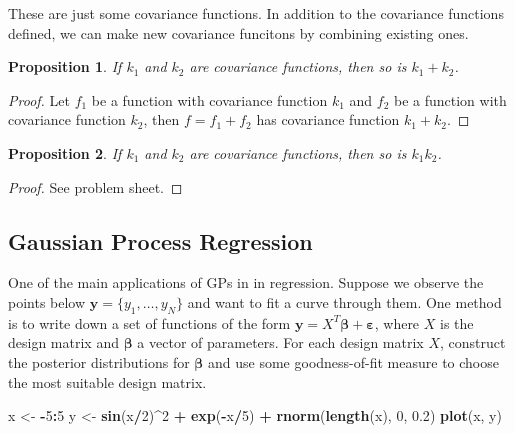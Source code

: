 \documentclass[
]{book}
\newenvironment{Shaded}{\begin{snugshade}}{\end{snugshade}}
\newcommand{\DecValTok}[1]{\textcolor[rgb]{0.00,0.00,0.81}{#1}}
\newcommand{\FloatTok}[1]{\textcolor[rgb]{0.00,0.00,0.81}{#1}}
\newcommand{\FunctionTok}[1]{\textcolor[rgb]{0.13,0.29,0.53}{\textbf{#1}}}
\newcommand{\NormalTok}[1]{#1}
\newcommand{\OtherTok}[1]{\textcolor[rgb]{0.56,0.35,0.01}{#1}}
\newcommand{\SpecialCharTok}[1]{\textcolor[rgb]{0.81,0.36,0.00}{\textbf{#1}}}
\newtheorem{proposition}{Proposition}[chapter]
\theoremstyle{definition}
\theoremstyle{definition}
\theoremstyle{definition}
\theoremstyle{definition}
\theoremstyle{remark}
\begin{document}
These are just some covariance functions. In addition to the covariance functions defined, we can make new covariance funcitons by combining existing ones.

\begin{proposition}
If \(k_1\) and \(k_2\) are covariance functions, then so is \(k_1 + k_2\).
\end{proposition}

\begin{proof}
Let \(f_1\) be a function with covariance function \(k_1\) and \(f_2\) be a function with covariance function \(k_2\), then \(f = f_1 + f_2\) has covariance function \(k_1 + k_2\).
\end{proof}

\begin{proposition}
If \(k_1\) and \(k_2\) are covariance functions, then so is \(k_1k_2\).
\end{proposition}

\begin{proof}
See problem sheet.
\end{proof}

\subsection{Gaussian Process Regression}\label{gaussian-process-regression}

One of the main applications of GPs in in regression. Suppose we observe the points below \(\boldsymbol{y} = \{y_1, \ldots, y_N\}\) and want to fit a curve through them. One method is to write down a set of functions of the form \(\boldsymbol{y} =  X^T\boldsymbol{\beta} + \boldsymbol{\varepsilon}\), where \(X\) is the design matrix and \(\boldsymbol{\beta}\) a vector of parameters. For each design matrix \(X\), construct the posterior distributions for \(\boldsymbol{\beta}\) and use some goodness-of-fit measure to choose the most suitable design matrix.

\begin{Shaded}
\begin{Highlighting}[]
\NormalTok{x }\OtherTok{\textless{}{-}} \SpecialCharTok{{-}}\DecValTok{5}\SpecialCharTok{:}\DecValTok{5}
\NormalTok{y }\OtherTok{\textless{}{-}} \FunctionTok{sin}\NormalTok{(x}\SpecialCharTok{/}\DecValTok{2}\NormalTok{)}\SpecialCharTok{\^{}}\DecValTok{2} \SpecialCharTok{+} \FunctionTok{exp}\NormalTok{(}\SpecialCharTok{{-}}\NormalTok{x}\SpecialCharTok{/}\DecValTok{5}\NormalTok{) }\SpecialCharTok{+} \FunctionTok{rnorm}\NormalTok{(}\FunctionTok{length}\NormalTok{(x), }\DecValTok{0}\NormalTok{, }\FloatTok{0.2}\NormalTok{)}
\FunctionTok{plot}\NormalTok{(x, y)}
\end{Highlighting}
\end{Shaded}
\end{document}
